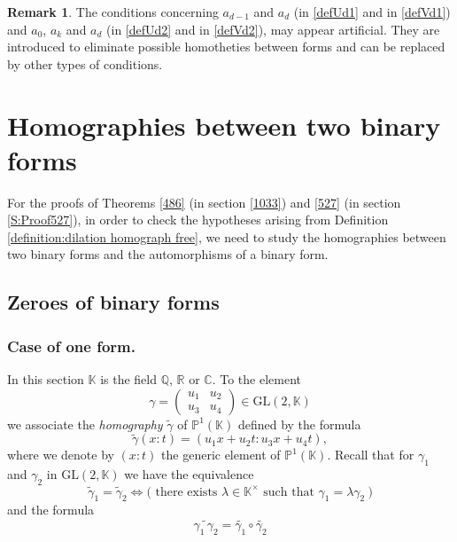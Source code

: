 \documentclass[10pt]{article}
\theoremstyle{definition}
\newtheorem{remark}[theorem]{Remark}
\numberwithin{equation}{section}
\newcommand {\Q}{{\mathbb{Q}}}
\newcommand {\C}{{\mathbb{C}}}
\newcommand {\R}{{\mathbb{R}}}
\newcommand {\K}{{\mathbb{K}}}
\newcommand{\GL}{\mathrm {GL}}
\begin{document}
\begin{remark}%
The conditions concerning $a_{d-1}$ and $a_d$ (in \eqref{defUd1} and in \eqref{defVd1}) and $a_0$, $a_k$ and $a_d$ (in \eqref{defUd2} and in \eqref{defVd2}), 
may appear artificial. They are introduced to eliminate possible homotheties between forms and can be replaced by other types of conditions.
\end{remark}

 \section{Homographies between two binary forms } \label{Section:tools}
 
For the proofs of Theorems \ref{486} (in section \ref{1033}) and \ref{527} (in section \ref{S:Proof527}), in order to check the hypotheses arising from Definition \ref{definition:dilation homograph free}, we need to study the homographies between two binary forms and the automorphisms of a binary form. 
 
 
 
\subsection{Zeroes of binary forms}%

\subsubsection{Case of one form.}\label{3.1.1}

 In this section $\K$ is the field $\Q$, $\R$ or $\C$. To the element 
\begin{equation}\label{a1a2a3a4}
\gamma = \begin{pmatrix} u_1 & u_2 \\ u_3& u_4\end{pmatrix} \in {\GL}(2, \K)
\end{equation}
we associate the {\em homography } $\tilde \gamma$ of $\mathbb P^1(\K)$ defined by the formula 
\[
\tilde \gamma (x:t) = (u_1x+u_2t : u_3 x+u_4t),
\]
where we denote by $(x : t)$ the generic element of $\mathbb P^1 (\K)$. 
Recall that for $\gamma_1$ and $\gamma_2$ in $ {\GL}(2, \K)$ we have the equivalence 
\begin{equation}\label{iff}
\tilde \gamma_1 =\tilde \gamma_2 \iff \bigl(\text { there exists } \lambda \in \K^\times \text{ such that } \gamma_1= \lambda \gamma_2\ \bigr)
\end{equation}
and the formula
\begin{equation}\label{tildetilde}
\widetilde{\gamma_1\,\gamma_2} = \tilde {\gamma_1} \circ \tilde{\gamma_2}
\end{equation}
 
\end{document}
